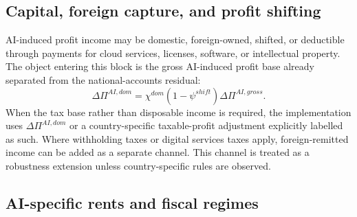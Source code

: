 \documentclass[11pt,a4paper]{article}
\begin{document}

\subsection{Capital, foreign capture, and profit shifting}

AI-induced profit income may be domestic, foreign-owned, shifted, or deductible through payments for cloud services, licenses, software, or intellectual property. The object entering this block is the gross AI-induced profit base already separated from the national-accounts residual:
\begin{equation}
    \Delta \Pi^{AI,dom}=\chi^{dom}(1-\psi^{shift})\Delta \Pi^{AI,gross}.
\end{equation}
When the tax base rather than disposable income is required, the implementation uses $\Delta \Pi^{AI,dom}$ or a country-specific taxable-profit adjustment explicitly labelled as such.
Where withholding taxes or digital services taxes apply, foreign-remitted income can be added as a separate channel. This channel is treated as a robustness extension unless country-specific rules are observed.

\subsection{AI-specific rents and fiscal regimes}
\end{document}
